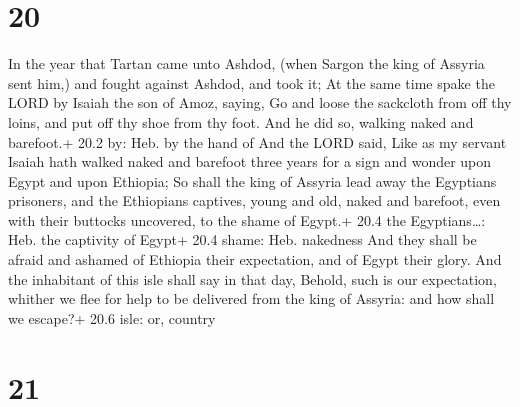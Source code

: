\hypertarget{section-19}{%
\section{20}\label{section-19}}

 In the year that Tartan came unto Ashdod, (when Sargon the
king of Assyria sent him,) and fought against Ashdod, and took it;
 At the same time spake the LORD by Isaiah the son of Amoz,
saying, Go and loose the sackcloth from off thy loins, and put off thy
shoe from thy foot. And he did so, walking naked and barefoot.+ 20.2 by:
Heb. by the hand of  And the LORD said, Like as my servant
Isaiah hath walked naked and barefoot three years for a sign and wonder
upon Egypt and upon Ethiopia;  So shall the king of Assyria
lead away the Egyptians prisoners, and the Ethiopians captives, young
and old, naked and barefoot, even with their buttocks uncovered, to the
shame of Egypt.+ 20.4 the Egyptians\ldots: Heb. the captivity of Egypt+
20.4 shame: Heb. nakedness  And they shall be afraid and
ashamed of Ethiopia their expectation, and of Egypt their glory.
 And the inhabitant of this isle shall say in that day,
Behold, such is our expectation, whither we flee for help to be
delivered from the king of Assyria: and how shall we escape?+ 20.6 isle:
or, country

\hypertarget{section-20}{%
\section{21}\label{section-20}}

